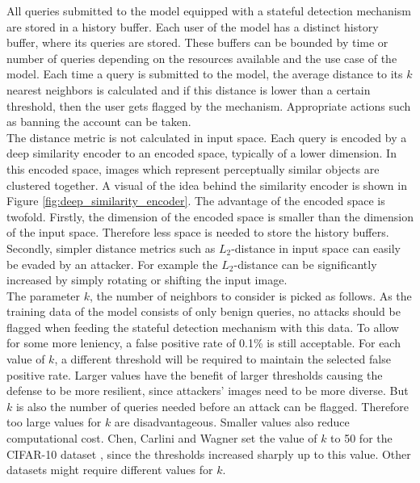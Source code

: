 All queries submitted to the model equipped with a stateful detection mechanism are stored in a history buffer. Each user of the model has a distinct history buffer, where its queries are stored. These buffers can be bounded by time or number of queries depending on the resources available and the use case of the model. Each time a query is submitted to the model, the average distance to its $k$ nearest neighbors is calculated and if this distance is lower than a certain threshold, then the user gets flagged by the mechanism. Appropriate actions such as banning the account can be taken.\\

The distance metric is not calculated in input space. Each query is encoded by a deep similarity encoder \cite{deep_similarity_encoder} to an encoded space, typically of a lower dimension. In this encoded space, images which represent perceptually similar objects are clustered together. A visual of the idea behind the similarity encoder is shown in Figure \ref{fig:deep_similarity_encoder}. The advantage of the encoded space is twofold. Firstly, the dimension of the encoded space is smaller than the dimension of the input space. Therefore less space is needed to store the history buffers. Secondly, simpler distance metrics such as $L_2$-distance in input space can easily be evaded by an attacker. For example the $L_2$-distance can be significantly increased by simply rotating or shifting the input image.\\

The parameter $k$, the number of neighbors to consider is picked as follows. As the training data of the model consists of only benign queries, no attacks should be flagged when feeding the stateful detection mechanism with this data. To allow for some more leniency, a false positive rate of 0.1\% is still acceptable. For each value of $k$, a different threshold will be required to maintain the selected false positive rate. Larger values have the benefit of larger thresholds causing the defense to be more resilient, since attackers' images need to be more diverse. But $k$ is also the number of queries needed before an attack can be flagged. Therefore too large values for $k$ are disadvantageous. Smaller values also reduce computational cost. Chen, Carlini and Wagner set the value of $k$ to 50 for the CIFAR-10  dataset \cite{cifar}, since the thresholds increased sharply up to this value. Other datasets might require different values for $k$.

